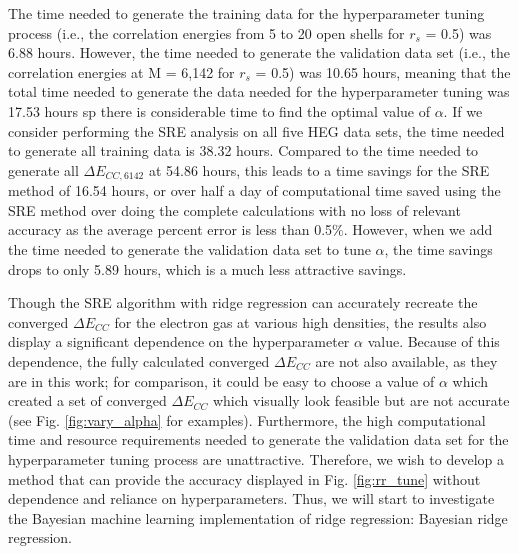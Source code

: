 The time needed to generate the training data for the hyperparameter tuning process (i.e., the correlation energies from 5 to 20 open shells for $r_s$ = 0.5) was 6.88 hours. However, the time needed to generate the validation data set (i.e., the correlation energies at M = 6,142 for $r_s$ = 0.5) was 10.65 hours, meaning that the total time needed to generate the data needed for the hyperparameter tuning was 17.53 hours sp there is considerable time to find the optimal value of $\alpha$. If we consider performing the SRE analysis on all five HEG data sets, the time needed to generate all training data is 38.32 hours. Compared to the time needed to generate all $\Delta E_{CC,6142}$ at 54.86 hours, this leads to a time savings for the SRE method of 16.54 hours, or over half a day of computational time saved using the SRE method over doing the complete calculations with no loss of relevant accuracy as the average percent error is less than 0.5$\%$. However, when we add the time needed to generate the validation data set to tune $\alpha$, the time savings drops to only 5.89 hours, which is a much less attractive savings.


Though the SRE algorithm with ridge regression can accurately recreate the converged $\Delta E_{CC}$ for the electron gas at various high densities, the results also display a significant dependence on the hyperparameter $\alpha$ value. Because of this dependence, the fully calculated converged $\Delta E_{CC}$ are not also available, as they are in this work; for comparison, it could be easy to choose a value of $\alpha$ which created a set of converged $\Delta E_{CC}$ which visually look feasible but are not accurate (see Fig. \ref{fig:vary_alpha} for examples). Furthermore, the high computational time and resource requirements needed to generate the validation data set for the hyperparameter tuning process are unattractive. Therefore, we wish to develop a method that can provide the accuracy displayed in Fig. \ref{fig:rr_tune} without dependence and reliance on hyperparameters. Thus, we will start to investigate the Bayesian machine learning implementation of ridge regression: Bayesian ridge regression.
